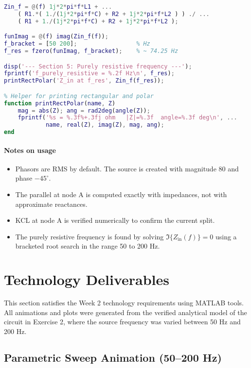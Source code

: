 \documentclass{article}
\begin{document}
\begin{lstlisting}[language=Matlab,caption={week2\_ex2\_variantC.m}]
% 5) Frequency for purely resistive input: Im{Zin(f)} = 0
Zin_f = @(f) 1j*2*pi*f*L1 + ...
    ( R1.*( 1./(1j*2*pi*f*C) + R2 + 1j*2*pi*f*L2 ) ) ./ ...
    ( R1 + 1./(1j*2*pi*f*C) + R2 + 1j*2*pi*f*L2 );

funImag = @(f) imag(Zin_f(f));
f_bracket = [50 200];                 % Hz
f_res = fzero(funImag, f_bracket);    % ~ 74.25 Hz

disp('--- Section 5: Purely resistive frequency ---');
fprintf('f_purely_resistive = %.2f Hz\n', f_res);
printRectPolar('Z_in at f_res', Zin_f(f_res));

% Helper for printing rectangular and polar
function printRectPolar(name, Z)
    mag = abs(Z); ang = rad2deg(angle(Z));
    fprintf('%s = %.3f%+.3fj ohm   |Z|=%.3f  angle=%.3f deg\n', ...
            name, real(Z), imag(Z), mag, ang);
end
\end{lstlisting}

\paragraph{Notes on usage}
\begin{itemize}
\item Phasors are RMS by default. The source is created with magnitude 80 and phase $-45^\circ$.
\item The parallel at node A is computed exactly with impedances, not with approximate reactances.
\item KCL at node A is verified numerically to confirm the current split.
\item The purely resistive frequency is found by solving $\Im\{Z_{\text{in}}(f)\}=0$ using a bracketed root search in the range 50 to 200 Hz.
\end{itemize}



\section{Technology Deliverables}

This section satisfies the Week 2 technology requirements using MATLAB tools.
All animations and plots were generated from the verified analytical model of the circuit in Exercise 2, where
the source frequency was varied between 50 Hz and 200 Hz.

\subsection{Parametric Sweep Animation (50--200 Hz)}
\end{document}
